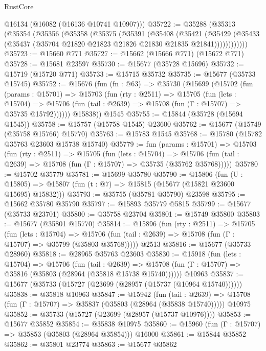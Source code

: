 \begin{lexlean}{RustCore}
\begin{coremodule}
      @16134
      (@16082 (@16136 @10741 @10907)))
@35722 := @35288
    (@35313
      (@35354
        (@35356
          (@35358
            (@35375
              (@35391
                (@35408
                  (@35421
                    (@35429
                      (@35433 (@35437 (@35704 @21820 @21823 @21826 @21830 @21835 @21841))))))))))))
@35723 := @15660 @771
@35727 := @15662 (@15666 @771) (@15672 @771)
@35728 := @15681 @23597
@35730 := @15677 (@35728 @15696)
@35732 := @15719 (@15720 @771)
@35733 := @15715 @35732
@35735 := @15677 (@35733 @15745)
@35752 := @15676
    (fun (fn : @63) =>
    @35730
      (@15699
        (@15702
          (fun (params : @15701) =>
          @15703
            (fun (rty : @2511) =>
            @15705
              (fun (lets : @15704) =>
              @15706 (fun (tail : @2639) => @15708 (fun (Γ : @15707) => @35735 @15792))))))
        @15838))
    @1545
@35755 := @15844 (@35728 (@15694 @1545))
@35758 := @15757 (@15758 @1545) @23600
@35762 := @15677 (@15749 (@35758 @15766) @15770)
@35763 := @15783 @1545
@35768 := @15780 (@15782 @35763 @23603 @15738 @15740)
@35779 := fun (params : @15701) =>
  @15703
    (fun (rty : @2511) =>
    @15705
      (fun (lets : @15704) =>
      @15706 (fun (tail : @2639) => @15708 (fun (Γ : @15707) => @35735 (@35762 @35768)))))
@35780 := @15702 @35779
@35781 := @15699 @35780
@35790 := @15806
    (fun (U : @15805) => @15807 (fun (t : @7) => @15815 (@15677 (@15821 @23600 @15695) @15832)))
@35793 := @35755 (@35781 @35790) @23598
@35795 := @15662 @35780 @35790
@35797 := @15893 @35779 @5815
@35799 := @15677 (@35733 @23701)
@35800 := @35758 @23704
@35801 := @15749 @35800
@35803 := @15677 (@35801 @15770)
@35814 := @15896
    (fun (rty : @2511) =>
    @15705
      (fun (lets : @15704) =>
      @15706 (fun (tail : @2639) => @15708 (fun (Γ : @15707) => @35799 (@35803 @35768)))))
    @2513
@35816 := @15677 (@35733 @28960)
@35818 := @28965 @35763 @23603
@35830 := @15918
    (fun (lets : @15704) =>
    @15706
      (fun (tail : @2639) =>
      @15708 (fun (Γ : @15707) => @35816 (@35803 (@28964 (@35818 @15738 @15740))))))
    @10963
@35837 := @15677 (@35733 (@15727 (@23699 (@28957 (@15737 (@10964 @15740))))))
@35838 := @35818 @10963
@35847 := @15942
    (fun (tail : @2639) => @15708 (fun (Γ : @15707) => @35837 (@35803 (@28964 (@35838 @15740)))))
    @10975
@35852 := @35733 (@15727 (@23699 (@28957 (@15737 @10976))))
@35853 := @15677 @35852
@35854 := @35838 @10975
@35860 := @15960 (fun (Γ : @15707) => @35853 (@35803 (@28964 @35854))) @16000
@35861 := @15844 @35852
@35862 := @35801 @23774
@35863 := @15677 @35862

\end{coremodule}
\end{lexlean}
